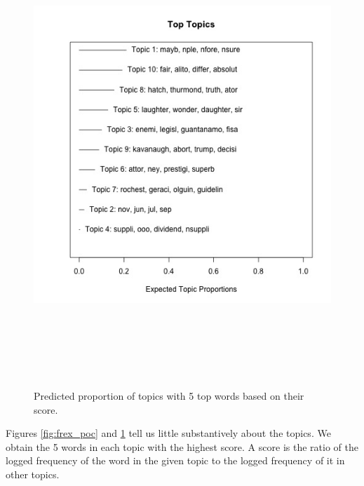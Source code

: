 \documentclass [12pt]{article}
\begin{document}
\begin{figure}[H]
    \centering
    \includegraphics[height = 175mm, width = 175mm]{../tables_figures/stm_male_frex.jpg}
    \caption{Predicted proportion of topics with 5 top words based on their score.}
    \label{fig:frex_male}
\end{figure}
	    
Figures \ref{fig:frex_poc} and \ref{fig:frex_male} tell us little substantively about the topics. We obtain the 5 words in each topic with the highest score. A score is the ratio of the logged frequency of the word in the given topic to the logged frequency of it in other topics.  
\end{document}
